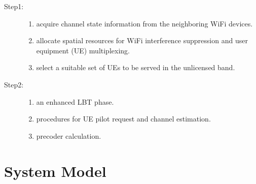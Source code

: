 \documentclass[12pt, onecolumn]{IEEEtran}
\begin{document}
\begin{description}
  \item[Step1:] %
                    \begin{enumerate}
                      \item acquire channel state information from the neighboring WiFi devices.
                      \item allocate spatial resources for WiFi interference suppression and user equipment (UE) multiplexing.
                      \item select a suitable set of UEs to be served in the unlicensed band.
                    \end{enumerate}
  \item[Step2:] %
                    \begin{enumerate}
                        \item an enhanced LBT phase.
                        \item procedures for UE pilot request and channel estimation.
                        \item precoder calculation.
                    \end{enumerate}
\end{description}


\section{System Model}
\end{document}
